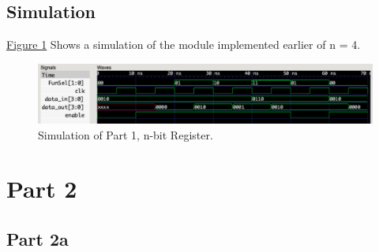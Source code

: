 \documentclass[pdftex,12pt,a4paper]{article}
\begin{document}
\subsection{Simulation}
\hyperref[fig:part1_sim]{Figure \ref{fig:part1_sim}} Shows a simulation of the module implemented earlier of n = 4.
\begin{figure}[H]
\centering
\includegraphics[width=1\textwidth]{part1_sim.png}
\caption{Simulation of Part 1, n-bit Register.}
\label{fig:part1_sim}
\end{figure}

\section{Part 2}

\subsection{Part 2a}
\end{document}
